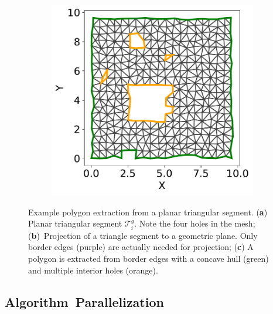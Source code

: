 \begin{figure}[H]
\begin{subfigure}[t]{.30\linewidth}
    \caption{\label{fig:ch3_polygon_extraction_b}}
  \end{subfigure}
  \hfill
  \begin{subfigure}[t]{.30\linewidth}
    \centering\includegraphics[clip,trim=0cm 0cm 0cm 0cm,width=.99\linewidth]{chapter_3_polylidar3d/imgs/polygon/PolygonExtraction_b2.pdf}
    \caption{\label{fig:ch3_polygon_extraction_c}}
  \end{subfigure}
  \caption[Example polygon extraction from a planar triangular segment]{Example polygon extraction from a planar triangular segment. (\textbf{a}) Planar triangular segment $\mathcal{T}^{g}_i$. Note the four holes in the mesh; (\textbf{b})~Projection of a triangle segment to a geometric plane. Only border edges (purple) are actually needed for projection; (\textbf{c}) A polygon is extracted from border edges with a concave hull (green) and multiple interior holes (orange). }\label{fig:ch3_polygon_extraction}
\end{figure}



\subsection{Algorithm~Parallelization}\label{sec:ch3_methods_polylidar_parallel}

